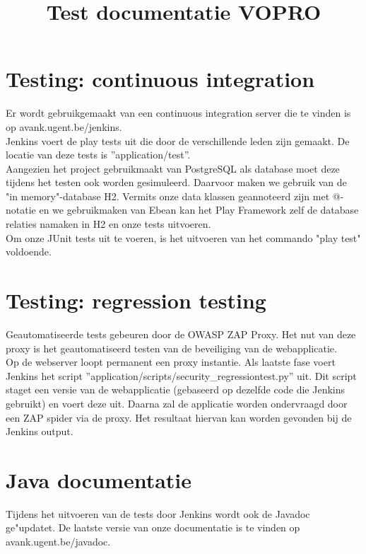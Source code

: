 \documentclass[10pt,a4paper]{article}
\title{Test documentatie VOPRO}
\begin{document}
\section*{Testing: continuous integration}
Er wordt gebruikgemaakt van een continuous integration server die te vinden is op avank.ugent.be/jenkins.\\
Jenkins voert de play tests uit die door de verschillende leden zijn gemaakt. De locatie van deze tests is ''application/test''. \\

Aangezien het project gebruikmaakt van PostgreSQL als database moet deze tijdens het testen ook worden gesimuleerd. Daarvoor maken we gebruik van de "in memory"-database H2. Vermits onze data klassen geannoteerd zijn met @-notatie en we gebruikmaken van Ebean kan het Play Framework zelf de database relaties namaken in H2 en onze tests uitvoeren.\\

Om onze JUnit tests uit te voeren, is het uitvoeren van het commando "play test" voldoende.

\section*{Testing: regression testing}
Geautomatiseerde tests gebeuren door de OWASP ZAP Proxy. Het nut van deze proxy is het geautomatiseerd testen van de beveiliging van de webapplicatie. \\
Op de webserver loopt permanent een proxy instantie. Als laatste fase voert Jenkins het script ''application/scripts/security\_regressiontest.py'' uit. Dit script staget een versie van de webapplicatie (gebaseerd op dezelfde code die Jenkins gebruikt) en voert deze uit. Daarna zal de applicatie worden ondervraagd door een ZAP spider via de proxy. Het resultaat hiervan kan worden gevonden bij de Jenkins output. 

\section*{Java documentatie}
Tijdens het uitvoeren van de tests door Jenkins wordt ook de Javadoc ge"updatet. 
De laatste versie van onze documentatie is te vinden op avank.ugent.be/javadoc.
\end{document}

